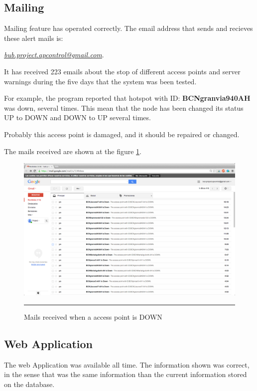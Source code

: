 \documentclass[12pt, a4paper,twoside]{tesi_upf}
\begin{document}
    \subsection {Mailing}
Mailing feature has operated correctly. The email address that sends and recieves these alert mails is: {\emph{\href{mailto:bub.project.apcontrol@gmail.com}{bub.project.apcontrol@gmail.com}}.

It has received 223 emails about the stop of different access points and server warnings during the five days that the system was been tested.
    
    For example, the program reported that hotspot with ID: \textbf{BCNgranvia940AH} was down, several times. This mean that the node has been changed its status UP to DOWN and DOWN to UP several times. 
    
    Probably this access point is damaged, and it should be repaired or changed.
    
    The mails received are shown at the figure \ref{fig:mail}.\\
    
        \begin{figure}[htbp]
          \centering
              \includegraphics[scale=0.3]{./figures/mails.png}
              \rule{32em}{0.5pt}
            \caption[Mails received when a access point is DOWN]{Mails received when a access point is DOWN}
            \label{fig:mail}
        \end{figure}
    
    \subsection{Web Application}
    The web Application was available all time. The information shown was correct, in the sense that was the same information than the current information stored on the database.
    
}
\end{document}
